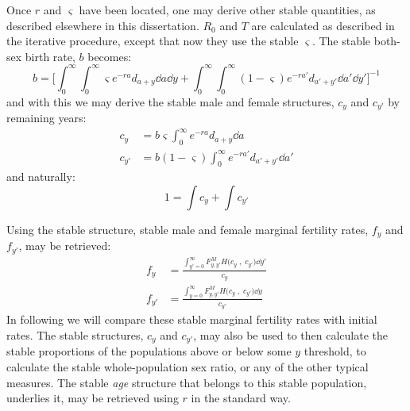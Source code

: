 \FloatBarrier
Once $r$ and $\varsigma$ have been located, one may derive other stable
quantities, as described elsewhere in this dissertation. $R_0$ and $T$ are
calculated as described in the iterative procedure, except that now they use
the stable $\varsigma$. The stable both-sex birth rate, $b$ becomes:
\begin{equation}
b = \Bigg[\int_0^\infty  \int _0^\infty \varsigma
 e^{-ra}d_{a+y}\dd a \dd y + \int_0^\infty \int _0^\infty (1-\varsigma)
 e^{-ra'}d_{a'+y'} \dd a' \dd y' \Bigg] ^{-1}
\end{equation}
and with this we may derive the stable male and female structures, $c_y$ and
$c_{y'}$ by remaining years:
\begin{align}
\label{eq:schoenexcy}
c_y &= b\varsigma \int _0^\infty e^{-ra}d_{a+y}\dd a \\
c_{y'} &= b(1-\varsigma) \int _0^\infty e^{-ra'}d_{a'+y'}\dd a'
\end{align}
and naturally:
\begin{equation}
1 = \int c_y + \int c_{y'}
\end{equation}

Using the stable structure, stable male and female marginal fertility rates,
$f_y$ and $f_{y'}$, may be retrieved:
\begin{align}
  f_y &=  \frac{\int_{y'=0}^\infty F_{y,y'}^M H\Big(c_y\;,\; c_{y'}\Big)
  \dd y'}{c_y} \\
  f_{y'} &=  \frac{\int_{y=0}^\infty F_{y,y'}^M H\Big(c_y\;,\; c_{y'}\Big)
  \dd y}{c_{y'}} 
\end{align}
In following we will compare these stable marginal fertility rates with initial
rates. The stable structures, $c_y$ and $c_{y'}$, may also be used to then
calculate the stable proportions of the populations above or below some $y$ threshold, to calculate the stable
whole-population sex ratio, or any of the other typical measures. The stable
\textit{age} structure that belongs to this stable population, underlies it, may
be retrieved using $r$ in the standard way.

\FloatBarrier